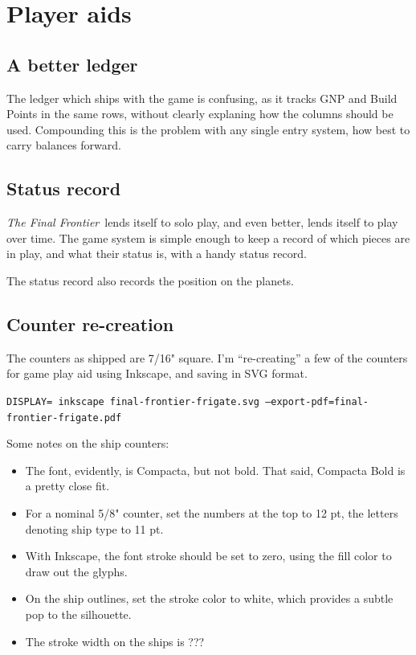 \documentclass[10pt]{article}
\def\tff{{\em The Final Frontier}}
\begin{document}
\section{Player aids}

\subsection{A better ledger}

The ledger which ships with the game is confusing, as it tracks GNP and
Build Points in the same rows, without clearly explaning how the columns
should be used. Compounding this is the problem with any single entry system,
how best to carry balances forward.

\subsection{Status record}

\tff\ lends itself to solo play, and even better, lends itself
to play over time. The game system is simple enough to keep a record of
which pieces are in play, and what their status is, with a handy status
record.

The status record also records the position on the planets.

\subsection{Counter re-creation}

The counters as shipped are 7/16" square. I'm ``re-creating'' a few of the
counters for game play aid using Inkscape, and saving in SVG format.

{\tt DISPLAY= inkscape final-frontier-frigate.svg --export-pdf=final-frontier-frigate.pdf}

Some notes on the ship counters:

\begin{itemize}
  \item The font, evidently, is Compacta, but not bold. That said, Compacta Bold
    is a pretty close fit.
  \item For a nominal 5/8" counter, set the numbers at the top to 12 pt, the letters
    denoting ship type to 11 pt.
  \item With Inkscape, the font stroke should be set to zero, using the fill color to
    draw out the glyphs.
  \item On the ship outlines, set the stroke color to white, which provides a subtle pop
    to the silhouette.
  \item The stroke width on the ships is ???
\end{itemize}
\end{document}
